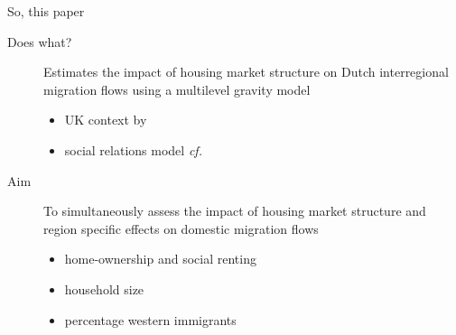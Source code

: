 \documentclass{beamer}
\begin{document}
\begin{frame}{So, this paper}
  \begin{description}
  \item[Does what?] \alert{Estimates} the impact of housing market
	  structure on Dutch interregional migration flows using a
	  \alert{multilevel} gravity model
    \begin{footnotesize}
	\begin{itemize}
	  \item \footnotesize UK context by \citet{congdon2010random}
	  \item \footnotesize \alert{social relations model} \emph{cf.}
		\citet{koster2014food,zhangAnalysingInterprovincialUrban2020}\newline
	\end{itemize}
  \end{footnotesize}
	\item[Aim] To \alert{simultaneously} assess the impact of housing market structure and region specific effects on domestic migration flows
  \begin{footnotesize}
	\begin{itemize}
	  \item \footnotesize home-ownership and social renting
	  \item \footnotesize household size
	  \item \footnotesize percentage western immigrants
	\end{itemize}
  \end{footnotesize}
  \end{description}
\end{frame}
\end{document}
